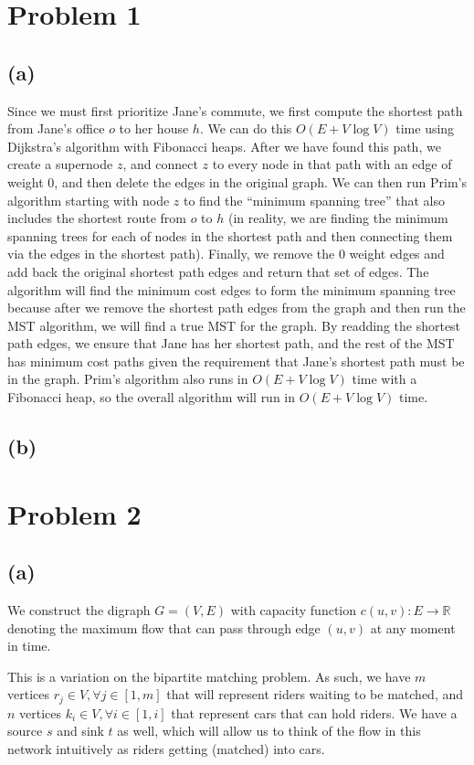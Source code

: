 \documentclass{6046}
\author{Matthew Feng}
\begin{document}
\section*{Problem 1}

\subsection*{(a)}
Since we must first prioritize Jane's commute, we first
compute the shortest path from Jane's office $o$ to her house $h$.
We can do this $O(E + V\log V)$ time using Dijkstra's algorithm
with Fibonacci heaps. After we have found this path,
we create a supernode $z$, and connect $z$ to every
node in that path with an edge of weight $0$, and then
delete the edges in the original graph. We can
then run Prim's algorithm starting with node $z$ to find
the ``minimum spanning tree'' that also includes the
shortest route from $o$ to $h$ (in reality, we 
are finding the minimum spanning trees for each of
nodes in the shortest path and then connecting them
via the edges in the shortest path). Finally, we remove
the $0$ weight edges and add back the original shortest path
edges and return that set of edges. The algorithm will
find the minimum cost edges to form the minimum spanning
tree because after we remove the shortest path edges
from the graph and then run the MST algorithm, we will
find a true MST for the graph. By readding the shortest path edges,
we ensure that Jane has her shortest path, and the rest of
the MST has minimum cost paths given the requirement that
Jane's shortest path must be in the graph. Prim's algorithm
also runs in $O(E + V\log V)$ time with a Fibonacci heap,
so the overall algorithm will run in $O(E + V\log V)$ time.

\subsection*{(b)}

\section*{Problem 2}
\subsection*{(a)}
We construct the digraph $G = (V, E)$ with capacity function
$c(u, v): E \rightarrow \mathbb{R}$ denoting the
maximum flow that can pass through edge $(u, v)$ at
any moment in time.

This is a variation on the bipartite matching problem.
As such, we have $m$ vertices $r_j \in V, \forall
j \in [1, m]$ that will represent riders waiting to be
matched, and $n$ vertices $k_i \in V, \forall i \in
[1, i]$ that represent cars that
can hold riders. We have a source $s$ and
sink $t$ as well, which will allow us to think
of the flow in this network intuitively as riders
getting (matched) into cars.
\end{document}
